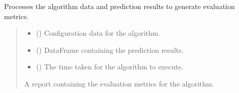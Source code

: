 \documentclass[letterpaper,10pt,english]{sphinxmanual}
\begin{document}
\begin{fulllineitems}
\begin{fulllineitems}
\end{fulllineitems}


\begin{fulllineitems}
\label{\detokenize{modules:application.services.AlgorithmDataProcesor.AlgorithmDataProcesor.process}}
\pysigstartsignatures
{}
\pysigstopsignatures
\sphinxAtStartPar
Processes the algorithm data and prediction results to generate evaluation metrics.
\begin{quote}\begin{description}
\begin{itemize}
\item {} 
\sphinxAtStartPar
{} ({\hyperref[\detokenize{modules:domain.interfaces.AlgorithmConfigurator.AlgorithmConfigurator}]{}}) \textendash{} Configuration data for the algorithm.

\item {} 
\sphinxAtStartPar
{} () \textendash{} DataFrame containing the prediction results.

\item {} 
\sphinxAtStartPar
{} () \textendash{} The time taken for the algorithm to execute.

\end{itemize}

\sphinxAtStartPar
A report containing the evaluation metrics for the algorithm.

\sphinxAtStartPar
{\hyperref[\detokenize{modules:domain.models.BasicReport.BasicReport}]{}}

\end{description}\end{quote}

\end{fulllineitems}


\end{fulllineitems}
\end{document}
